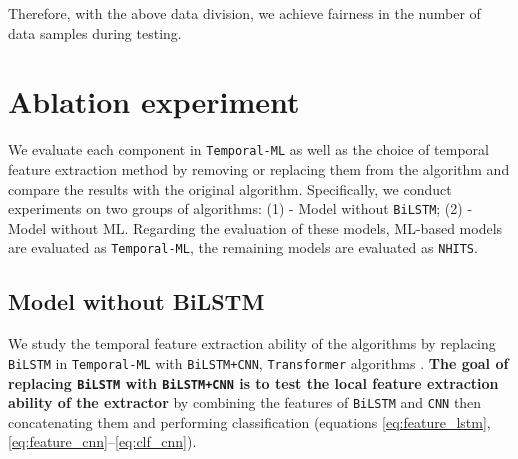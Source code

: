 Therefore, with the above data division, we achieve fairness in the number of data samples during testing.

\section{Ablation experiment}
\label{sec:ab_ex}



We evaluate each component in \verb|Temporal-ML| as well as the choice of temporal feature extraction method by removing or replacing them from the algorithm and compare the results with the original algorithm. Specifically, we conduct experiments on two groups of algorithms: (1) - Model without \verb|BiLSTM|; (2) - Model without ML. Regarding the evaluation of these models, ML-based models are evaluated as \verb|Temporal-ML|, the remaining models are evaluated as \verb|NHITS|.

\subsection{Model without BiLSTM}
\label{subsec:ablation_lstm}


We study the temporal feature extraction ability of the algorithms by replacing \verb|BiLSTM| in \verb|Temporal-ML| with \verb|BiLSTM+CNN|, \verb|Transformer| algorithms \cite{vaswani2017attention}. \textbf{The goal of replacing \Verb|BiLSTM| with \Verb|BiLSTM+CNN| is to test the local feature extraction ability of the extractor} by combining the features of \verb|BiLSTM| and \verb|CNN| then concatenating them and performing classification (equations \ref{eq:feature_lstm}, \ref{eq:feature_cnn}–\ref{eq:clf_cnn}).

